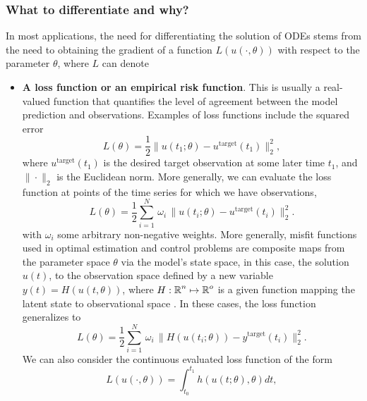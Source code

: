 \subsubsection{What to differentiate and why?}

In most applications, the need for differentiating the solution of ODEs stems from the need to obtaining the gradient of a function $L(u(\cdot, \theta))$ with respect to the parameter $\theta$, where $L$ can denote
\begin{itemize}
    \item \textbf{A loss function or an empirical risk function}. This is usually a real-valued function that quantifies the level of agreement between the model prediction and observations. Examples of loss functions include the squared error
    \begin{equation}
         L(\theta) = \frac{1}{2} \| u(t_1; \theta) - u^{\text{target}}(t_1) \|_2^2,
         \label{eq:quadratic-loss-function}
    \end{equation}
    where $u^{\text{target}}(t_1)$ is the desired target observation at some later time $t_1$, and $\| \cdot \|_2$ is the Euclidean norm.
    More generally, we can evaluate the loss function at points of the time series for which we have observations, 
    \begin{equation}
        L(\theta) 
        = 
        \frac{1}{2} \sum_{i=1}^N 
        \, \omega_i \,
        \| u(t_i; \theta) - u^{\text{target}}(t_i) \|_2^2.
    \end{equation}
    with $\omega_i$ some arbitrary non-negative weights.
    More generally, misfit functions used in optimal estimation and control problems are composite maps from the parameter space $\theta$ via the model's state space, in this case, the solution $u(t)$, to the observation space defined by a new variable $y(t) = H(u(t, \theta))$, where $H: \operatorname{\mathbb{R}}^n \mapsto \operatorname{\mathbb{R}}^o$ is a given function mapping the latent state to observational space \cite{1975-Bryson-Ho-optimal-control}. 
    In these cases, the loss function generalizes to 
    \begin{equation}
        L(\theta) 
        =
        \frac{1}{2} 
        \sum_{i=1}^N
        \, \omega_i \,
        \| H(u(t_i; \theta)) - y^{\text{target}}(t_i) \|_2^2.
        \label{eq:loss-state-observation}
    \end{equation}
    We can also consider the continuous evaluated loss function of the form
    \begin{equation}
         L(u(\cdot, \theta)) = \int_{t_0}^{t_1} h( u(t;\theta), \theta)  dt, 

\end{equation}
\end{itemize}

